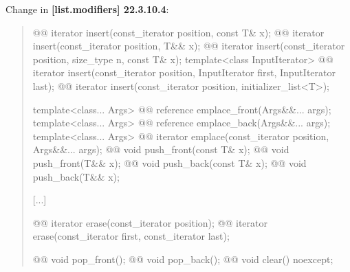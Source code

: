 \documentclass{wg21}
\begin{document}
Change in \textbf{[list.modifiers] 22.3.10.4}:
\begin{quote}
\begin{itemdecl}
@@ iterator insert(const_iterator position, const T& x);
@@ iterator insert(const_iterator position, T&& x);
@@ iterator insert(const_iterator position, size_type n, const T& x);
template<class InputIterator>
  @@ iterator insert(const_iterator position, InputIterator first, InputIterator last);
@@ iterator insert(const_iterator position, initializer_list<T>);

template<class... Args> @@ reference emplace_front(Args&&... args);
template<class... Args> @@ reference emplace_back(Args&&... args);
template<class... Args> @@ iterator emplace(const_iterator position, Args&&... args);
@@ void push_front(const T& x);
@@ void push_front(T&& x);
@@ void push_back(const T& x);
@@ void push_back(T&& x);
\end{itemdecl}
[...]
\begin{itemdecl}
@@ iterator erase(const_iterator position);
@@ iterator erase(const_iterator first, const_iterator last);

@@ void pop_front();
@@ void pop_back();
@@ void clear() noexcept;
\end{itemdecl}
\end{quote}
\end{document}
